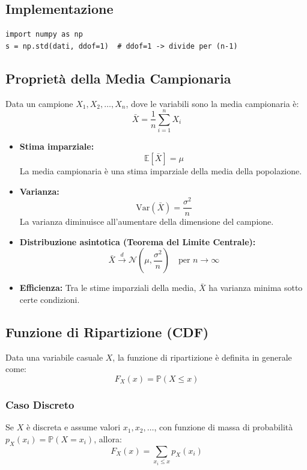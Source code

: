 \documentclass{article}
\begin{document}
\subsection*{Implementazione}
\begin{lstlisting}
import numpy as np
s = np.std(dati, ddof=1)  # ddof=1 -> divide per (n-1)
\end{lstlisting}

\subsection*{Proprietà della Media Campionaria}

Data un campione $X_1, X_2, \dots, X_n$, dove le variabili sono  la media campionaria è:
\[
\bar{X} = \frac{1}{n} \sum_{i=1}^{n} X_i
\]

\begin{itemize}
  \item \textbf{Stima imparziale:} 
  \[
  \mathbb{E}[\bar{X}] = \mu
  \]
  La media campionaria è una stima imparziale della media della popolazione.

  \item \textbf{Varianza:}
  \[
  \mathrm{Var}(\bar{X}) = \frac{\sigma^2}{n}
  \]
  La varianza diminuisce all'aumentare della dimensione del campione.

  \item \textbf{Distribuzione asintotica (Teorema del Limite Centrale):}
  \[
  \bar{X} \xrightarrow{d} \mathcal{N} \left( \mu, \frac{\sigma^2}{n} \right) \quad \text{per } n \to \infty
  \]

  \item \textbf{Efficienza:} 
  Tra le stime imparziali della media, $\bar{X}$ ha varianza minima sotto certe condizioni.
\end{itemize}

\subsection*{Funzione di Ripartizione (CDF)}

Data una variabile casuale $X$, la funzione di ripartizione è definita in generale come:
\[
F_X(x) = \mathbb{P}(X \leq x)
\]

\subsubsection*{Caso Discreto}
Se $X$ è discreta e assume valori $x_1, x_2, \dots$, con funzione di massa di probabilità $p_X(x_i) = \mathbb{P}(X = x_i)$, allora:
\[
F_X(x) = \sum_{x_i \leq x} p_X(x_i)
\]
\end{document}
